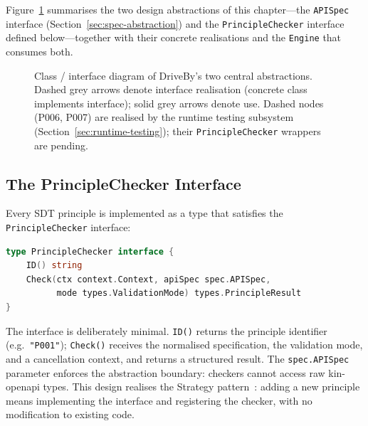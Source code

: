 Figure~\ref{fig:class-diagram} summarises the two design abstractions of this chapter---the \texttt{APISpec} interface (Section~\ref{sec:spec-abstraction}) and the \texttt{PrincipleChecker} interface defined below---together with their concrete realisations and the \texttt{Engine} that consumes both.

\begin{figure}[htbp]
\centering
\resizebox{\textwidth}{!}{}
\caption{Class / interface diagram of DriveBy's two central abstractions. Dashed grey arrows denote interface realisation (concrete class implements interface); solid grey arrows denote use. Dashed nodes (P006, P007) are realised by the runtime testing subsystem (Section~\ref{sec:runtime-testing}); their \texttt{PrincipleChecker} wrappers are pending.}
\label{fig:class-diagram}
\end{figure}

\subsection{The PrincipleChecker Interface}
\label{subsec:checker-interface}

Every SDT principle is implemented as a type that satisfies the \texttt{PrincipleChecker} interface:

\begin{lstlisting}[language=Go,caption={The PrincipleChecker interface (\texttt{principles/checker.go}).},label={lst:checker}]
type PrincipleChecker interface {
    ID() string
    Check(ctx context.Context, apiSpec spec.APISpec,
          mode types.ValidationMode) types.PrincipleResult
}
\end{lstlisting}

The interface is deliberately minimal. \texttt{ID()} returns the principle identifier (e.g.\ \texttt{"P001"}); \texttt{Check()} receives the normalised specification, the validation mode, and a cancellation context, and returns a structured result. The \texttt{spec.APISpec} parameter enforces the abstraction boundary: checkers cannot access raw kin-openapi types. This design realises the Strategy pattern~\cite{gof}: adding a new principle means implementing the interface and registering the checker, with no modification to existing code.

